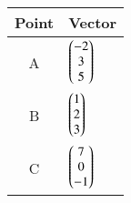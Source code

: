 \begin{tabular}{|c|p{3cm}|}
    \hline
    \textbf{Point} &\textbf{Vector} \\
    \hline
        A & $\begin{pmatrix}-2 \\ 3 \\ 5\end{pmatrix}$  \\
    \hline
        B & $\begin{pmatrix}1 \\ 2 \\ 3\end{pmatrix}$ \\
    \hline
        C & $\begin{pmatrix}7 \\ 0 \\ -1\end{pmatrix}$  \\
    \hline
\end{tabular}
